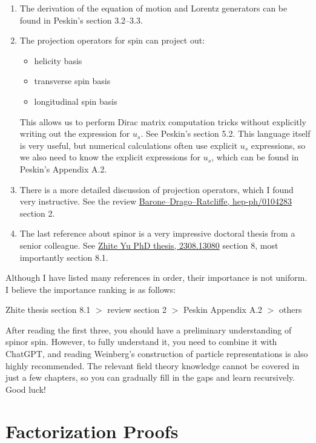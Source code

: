 \documentclass[12pt]{article}
\begin{document}
\begin{enumerate}
    \item The derivation of the equation of motion and Lorentz generators can be found in Peskin's section 3.2--3.3.
    
    \item The projection operators for spin can project out:
    \begin{itemize}
        \item helicity basis
        \item transverse spin basis
        \item longitudinal spin basis
    \end{itemize}
    This allows us to perform Dirac matrix computation tricks without explicitly writing out the expression for $u_s$. See Peskin's section 5.2. This language itself is very useful, but numerical calculations often use explicit $u_s$ expressions, so we also need to know the explicit expressions for $u_s$, which can be found in Peskin's Appendix A.2.
    
    \item There is a more detailed discussion of projection operators, which I found very instructive. See the review \href{https://arxiv.org/abs/hep-ph/0104283}{Barone--Drago--Ratcliffe, hep-ph/0104283} section 2.
    
    \item The last reference about spinor is a very impressive doctoral thesis from a senior colleague. See \href{http://arxiv.org/abs/2308.13080}{Zhite Yu PhD thesis, 2308.13080} section 8, most importantly section 8.1.
\end{enumerate}

Although I have listed many references in order, their importance is not uniform. I believe the importance ranking is as follows:

Zhite thesis section 8.1 $>$ review section 2 $>$ Peskin Appendix A.2 $>$ others

After reading the first three, you should have a preliminary understanding of spinor spin. However, to fully understand it, you need to combine it with ChatGPT, and reading Weinberg's construction of particle representations is also highly recommended. The relevant field theory knowledge cannot be covered in just a few chapters, so you can gradually fill in the gaps and learn recursively. Good luck!

\section{Factorization Proofs}
\end{document}
